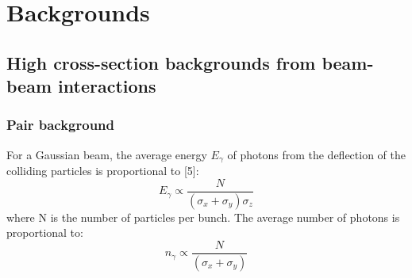 \section{Backgrounds}
\label{Backgrounds}
\subsection{High cross-section backgrounds from beam-beam interactions}
\label{BeamBeam}
\subsubsection{Pair background}
\label{BeamBeam:pairs}
For a Gaussian beam, the average energy $E_{\gamma}$ of photons from the deflection of the colliding particles is proportional to [5]:
\begin{equation}
 E_{\gamma} \propto \frac{N}{(\sigma_x+\sigma_y)\sigma_z}
 \label{eq:pair_energy}
\end{equation}
where N is the number of particles per bunch. The average number of photons is proportional to:
\begin{equation}
 n_{\gamma} \propto \frac{N}{(\sigma_x+\sigma_y)}
 \label{eq:pair_number}
\end{equation}

